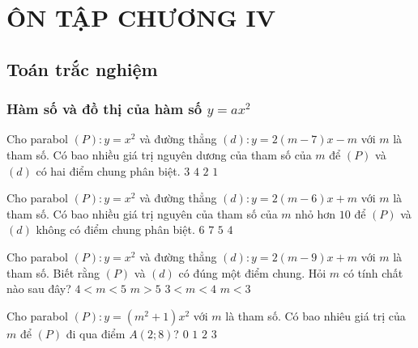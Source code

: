 
\section{ÔN TẬP CHƯƠNG IV}

\subsection{Toán trắc nghiệm}
\subsubsection{Hàm số và đồ thị của hàm số $y=ax^2$}
\begin{bt}
Cho parabol $(P):y=x^2$ và đường thẳng $(d):y=2(m-7)x-m$ với $m$ là tham số. Có bao nhiều giá trị nguyên dương của tham số của $m$ để $(P)$ và $(d)$ có hai điểm chung phân biệt.
\choice
{\True $3$}
{$4$}
{$2$}
{$1$}

\end{bt}
\begin{bt}
	Cho parabol $(P):y=x^2$ và đường thẳng $(d):y=2(m-6)x+m$ với $m$ là tham số. Có bao nhiều giá trị nguyên của tham số của $m$ nhỏ hơn $10$ để $(P)$ và $(d)$ không có điểm chung phân biệt.
	\choice
	{\True $6$}
	{$7$}
	{$5$}
	{$4$}
\end{bt}
\begin{bt}
	Cho parabol $(P):y=x^2$ và đường thẳng $(d):y=2(m-9)x+m$ với $m$ là tham số. Biết rằng $(P)$ và $(d)$ có đúng một điểm chung. Hỏi $m$ có tính chất nào sau đây?
	\choice
	{\True $4<m<5$}
	{$m>5$}
	{$3<m<4$}
	{$m<3$}
\end{bt}
\begin{bt}
Cho parabol $(P): y=(m^2+1)x^2$ với $m$ là tham số. Có bao nhiêu giá trị của $m$ để $(P)$ đi qua điểm $A(2;8)$?
\choice
{$0$}
{$1$}
{\True $2$}
{$3$}
\end{bt}
